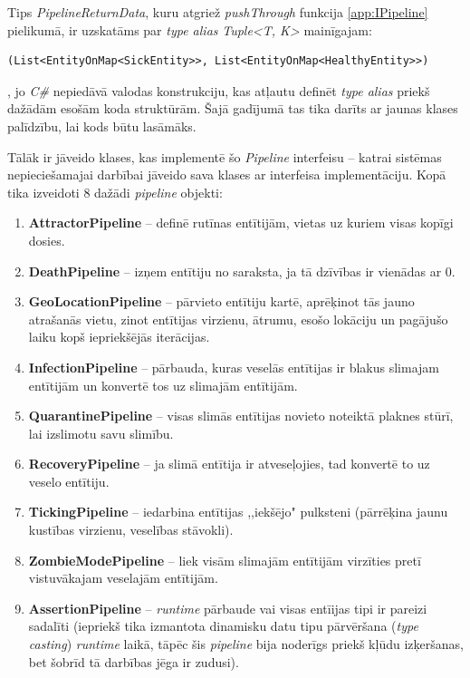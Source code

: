 Tips \emph{PipelineReturnData}, kuru atgriež \emph{pushThrough} funkcija \ref{app:IPipeline} pielikumā, ir
uzskatāms par \emph{type alias} \emph{Tuple<T, K>} mainīgajam:

{
\begin{verbatim}
(List<EntityOnMap<SickEntity>>, List<EntityOnMap<HealthyEntity>>)
\end{verbatim}
}

, jo \emph{C\#} nepiedāvā valodas konstrukciju, kas atļautu definēt
\emph{type alias} priekš dažādām esošām koda struktūrām. Šajā gadījumā tas tika
darīts ar jaunas klases palīdzību, lai kods būtu lasāmāks.

Tālāk ir jāveido klases, kas implementē šo \emph{Pipeline} interfeisu -- katrai sistēmas
nepieciešamajai darbībai jāveido sava klases ar interfeisa implementāciju. Kopā
tika izveidoti 8 dažādi \emph{pipeline} objekti:

\begin{enumerate}
    \item \textbf{AttractorPipeline} -- definē rutīnas entītijām, vietas uz kuriem visas kopīgi dosies.
    \item \textbf{DeathPipeline} -- izņem entītiju no saraksta, ja tā dzīvības ir vienādas ar \(0\).
    \item \textbf{GeoLocationPipeline} -- pārvieto entītiju kartē, aprēķinot tās jauno
        atrašanās vietu, zinot entītijas virzienu, ātrumu, esošo lokāciju un pagājušo
        laiku kopš iepriekšējās iterācijas.
    \item \textbf{InfectionPipeline} -- pārbauda, kuras veselās entītijas ir blakus slimajam
        entītijām un konvertē tos uz slimajām entītijām.
    \item \textbf{QuarantinePipeline} -- visas slimās entītijas novieto noteiktā plaknes
        stūrī, lai izslimotu savu slimību.
    \item \textbf{RecoveryPipeline} -- ja slimā entītija ir atveseļojies, tad konvertē to uz veselo entītiju.
    \item \textbf{TickingPipeline} -- iedarbina entītijas ,,iekšējo" pulksteni (pārrēķina jaunu kustības virzienu, veselības stāvokli).
    \item \textbf{ZombieModePipeline} -- liek visām slimajām entītijām virzīties pretī vistuvākajam veselajām entītijām.
    \item \textbf{AssertionPipeline} -- \emph{runtime} pārbaude vai visas entīijas tipi ir
        pareizi sadalīti (iepriekš tika izmantota dinamisku datu tipu
        pārvēršana (\emph{type casting}) \emph{runtime} laikā, tāpēc šis \emph{pipeline} bija
        noderīgs priekš kļūdu izķeršanas, bet šobrīd tā darbības jēga ir zudusi).
\end{enumerate}

